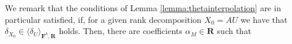 \documentclass[11pt]{amsart}
\theoremstyle{plain}
\newtheorem{lemma}[thm]{Lemma}
\theoremstyle{definition}
\newcommand{\F}{{\mathbf F}}
\newcommand{\alg}[1]{\mathbf{#1}}
\newcommand{\clonoid}[1]{\mathcal{#1}}
\newcommand{\clodO}{\clonoid{O}}
\newcommand{\algB}{\alg{B}}
\newcommand{\algR}{\alg{R}}
\DeclareMathOperator{\rk}{rk}
\DeclareMathOperator{\supp}{supp}
\DeclareMathOperator{\Id}{Id}
\begin{document}

We remark that the conditions of Lemma \ref{lemma:thetainterpolation} are in particular satisfied, if, for a given rank decomposition $X_0 = AU$ we have that $\delta_{X_0} \in \langle \delta_U \rangle_{\F^k,\algR}$ holds. Then, there are coefficients $\alpha_M \in \algR$ such that
\end{document}
